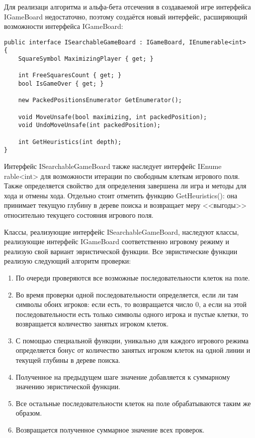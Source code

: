 Для реализаци алгоритма и альфа-бета отсечения в создаваемой игре интерфейса IGameBoard недостаточно, поэтому создаётся новый интерфейс, расширяющий возможности интерфейса IGameBoard:

\begin{lstlisting}[caption={Расширенный интерфейс игрового поля}]
public interface ISearchableGameBoard : IGameBoard, IEnumerable<int>
{
    SquareSymbol MaximizingPlayer { get; }

    int FreeSquaresCount { get; }
    bool IsGameOver { get; }

    new PackedPositionsEnumerator GetEnumerator();

    void MoveUnsafe(bool maximizing, int packedPosition);
    void UndoMoveUnsafe(int packedPosition);

    int GetHeuristics(int depth);
}
\end{lstlisting}

Интерфейс ISearchableGameBoard также наследует интерфейс IEnume \linebreak rable<int> для возможности итерации по свободным клеткам игрового поля. Также определяется свойство для определения завершена ли игра и методы для хода и отмены хода. Отдельно стоит отметить функцию GetHeuristics(): она принимает текущую глубину в дереве поиска и возвращает меру <<выгоды>> относительно текущего состояния игрового поля.

Классы, реализующие интерфейс ISearchableGameBoard, наследуют классы, реализующие интерфейс IGameBoard соответственно игровому режиму и реализую свой вариант эвристической функции. Все эвристические функции реализую следующий алгоритм проверки:

\begin{enumerate}[label=\arabic*, itemindent=\parindent + 2.25ex]
  \item По очереди проверяются все возможные последовательности клеток на поле.
  \item Во время проверки одной последовательности определяется, если ли там символы обоих игроков: если есть, то возвращается число 0, а если на этой последовательности есть только символы одного игрока и пустые клетки, то возвращается количество занятых игроком клеток.
  \item С помощью специальной функции, уникально для каждого игрового режима определяется бонус от количество занятых игроком клеток на одной линии и текущей глубины в дереве поиска.
  \item Полученное на предыдущем шаге значение добавляется к суммарному значению эвристической функции.
  \item Все остальные последовательности клеток на поле обрабатываются таким же образом.
  \item Возвращается полученное суммарное значение всех проверок.
\end{enumerate}

